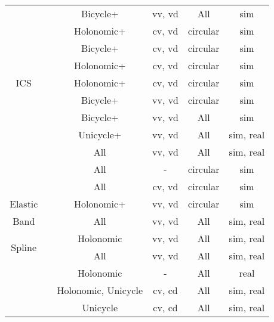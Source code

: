 \begin{table}[htpb]
\begin{tabular}{cccccc}
        \multirow{9}{*}{ICS}&\cite{petti2005safe}               & Bicycle+      & vv, vd & All & sim \\
                            &\cite{martinez2009collision}       & Holonomic+    & cv, vd & circular & sim \\
                            &\cite{martinez2008efficient}       & Bicycle+      & cv, vd & circular & sim \\
                            &\cite{gal2009efficient}            & Holonomic+    & cv, vd & circular & sim \\
                            &\cite{shiller2010nonlinear}        & Holonomic+    & cv, vd & circular & sim \\
                            &\cite{althoff2012safety}           & Bicycle+      & vv, vd & circular & sim \\
                            &\cite{bouraine2012provably}        & Bicycle+      & vv, vd & All & sim \\
                            &\cite{hernandez2015application}    & Unicycle+     & vv, vd & All & sim, real \\\midrule
        \multirow{3}{*}{Roadmap} &\cite{hsu2002randomized}      & All           & vv, vd & All & sim, real \\
                            &\cite{van2005roadmap}              & All           & \-- & circular & sim \\
                            &\cite{van2006anytime}              & All           & cv, vd & circular & sim \\\midrule
        Elastic             &\cite{quinlan1993elastic}          & Holonomic+    & vv, vd & circular & sim \\
        Band                &\cite{rosmann2013efficient, rosmann2015planning}   & All & vv, vd & All & sim, real \\\midrule
        \multirow{2}{*}{Spline} &\cite{mercy2016real}           & Holonomic     & vv, vd & All & sim, real \\
                            &\cite{mercy2017spline}             & All           & vv, vd & All & sim, real \\\midrule
                            &\cite{minguez2004nearness}         & Holonomic     & \-- & All & real \\
                            &\cite{ge2002dynamic}               & Holonomic, Unicycle & cv, cd & All & sim, real \\
                            &\cite{savkin2013simple}            & Unicycle      & cv, cd & All & sim, real \\
        \bottomrule
    \end{tabular}


\end{table}
